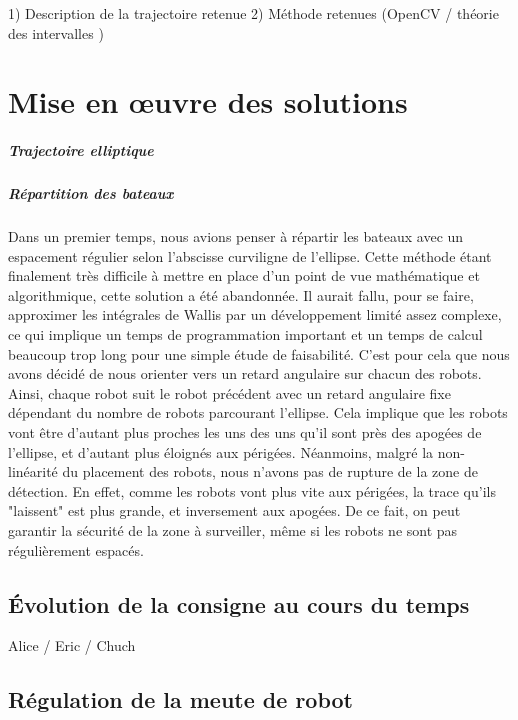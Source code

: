 \documentclass[10pt,a4paper]{report}
\begin{document}
1) Description de la trajectoire retenue
2) Méthode retenues (OpenCV / théorie des intervalles )


\chapter{Mise en œuvre des solutions}

\paragraph{Trajectoire elliptique}

\paragraph{Répartition des bateaux}
Dans un premier temps, nous avions penser à répartir les bateaux avec un espacement régulier selon l'abscisse curviligne de l'ellipse.
Cette méthode étant finalement très difficile à mettre en place d'un point de vue mathématique et algorithmique, cette solution a été abandonnée. Il aurait fallu, pour se faire, approximer les intégrales de Wallis par un développement limité assez complexe, ce qui implique un temps de programmation important et un temps de calcul beaucoup trop long pour une simple étude de faisabilité.
C'est pour cela que nous avons décidé de nous orienter vers un retard angulaire sur chacun des robots. Ainsi, chaque robot suit le robot précédent avec un retard angulaire fixe dépendant du nombre de robots parcourant l'ellipse. Cela implique que les robots vont être d'autant plus proches les uns des uns qu'il sont près des apogées de l'ellipse, et d'autant plus éloignés aux périgées.
Néanmoins, malgré la non-linéarité du placement des robots, nous n'avons pas de rupture de la zone de détection. En effet, comme les robots vont plus vite aux périgées, la trace qu'ils "laissent" est plus grande, et inversement aux apogées. De ce fait, on peut garantir la sécurité de la zone à surveiller, même si les robots ne sont pas régulièrement espacés.


\section{Évolution de la consigne au cours du temps}

Alice / Eric / Chuch

\section{Régulation de la meute de robot}
\end{document}
